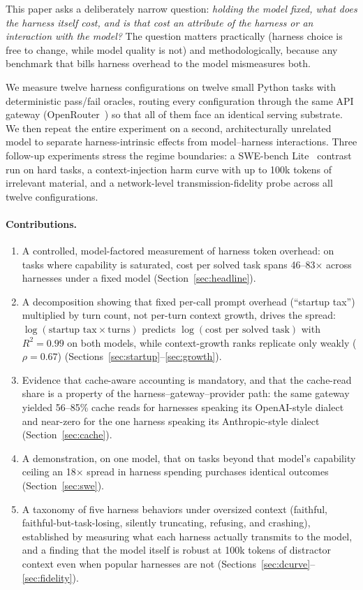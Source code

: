 \documentclass[11pt]{article}
\begin{document}
This paper asks a deliberately narrow question: \emph{holding the model fixed, what does the harness itself cost, and is that cost an attribute of the harness or an interaction with the model?} The question matters practically (harness choice is free to change, while model quality is not) and methodologically, because any benchmark that bills harness overhead to the model mismeasures both.

We measure twelve harness configurations on twelve small Python tasks with deterministic pass/fail oracles, routing every configuration through the same API gateway (OpenRouter~\citep{openrouter}) so that all of them face an identical serving substrate. We then repeat the entire experiment on a second, architecturally unrelated model to separate harness-intrinsic effects from model--harness interactions. Three follow-up experiments stress the regime boundaries: a SWE-bench Lite~\citep{jimenez2024swebench} contrast run on hard tasks, a context-injection harm curve with up to 100k tokens of irrelevant material, and a network-level transmission-fidelity probe across all twelve configurations.

\paragraph{Contributions.}
\begin{enumerate}
  \item A controlled, model-factored measurement of harness token overhead: on tasks where capability is saturated, cost per solved task spans 46--83$\times$ across harnesses under a fixed model (Section~\ref{sec:headline}).
  \item A decomposition showing that fixed per-call prompt overhead (``startup tax'') multiplied by turn count, not per-turn context growth, drives the spread: $\log(\text{startup tax} \times \text{turns})$ predicts $\log(\text{cost per solved task})$ with $R^2 = 0.99$ on both models, while context-growth ranks replicate only weakly ($\rho = 0.67$) (Sections~\ref{sec:startup}--\ref{sec:growth}).
  \item Evidence that cache-aware accounting is mandatory, and that the cache-read share is a property of the harness--gateway--provider path: the same gateway yielded 56--85\% cache reads for harnesses speaking its OpenAI-style dialect and near-zero for the one harness speaking its Anthropic-style dialect (Section~\ref{sec:cache}).
  \item A demonstration, on one model, that on tasks beyond that model's capability ceiling an 18$\times$ spread in harness spending purchases identical outcomes (Section~\ref{sec:swe}).
  \item A taxonomy of five harness behaviors under oversized context (faithful, faithful-but-task-losing, silently truncating, refusing, and crashing), established by measuring what each harness actually transmits to the model, and a finding that the model itself is robust at 100k tokens of distractor context even when popular harnesses are not (Sections~\ref{sec:dcurve}--\ref{sec:fidelity}).
\end{enumerate}
\end{document}
